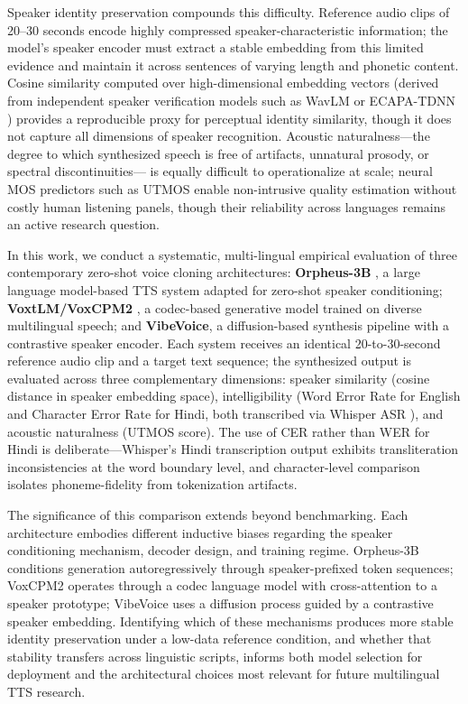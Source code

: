 Speaker identity preservation compounds this difficulty. Reference audio clips of 20--30 seconds encode highly compressed
speaker-characteristic information; the model's speaker encoder must extract a stable embedding from this limited evidence and
maintain it across sentences of varying length and phonetic content. Cosine similarity computed over high-dimensional embedding
vectors (derived from independent speaker verification models such as WavLM or ECAPA-TDNN \cite{chen2022wavlm, desplanques2020ecapa})
provides a reproducible proxy for perceptual identity similarity, though it does not capture all dimensions of speaker recognition.
Acoustic naturalness---the degree to which synthesized speech is free of artifacts, unnatural prosody, or spectral discontinuities---
is equally difficult to operationalize at scale; neural MOS predictors such as UTMOS \cite{saeki2022utmos} enable non-intrusive
quality estimation without costly human listening panels, though their reliability across languages remains an active research question.

In this work, we conduct a systematic, multi-lingual empirical evaluation of three contemporary zero-shot voice cloning
architectures: \textbf{Orpheus-3B} \cite{orpheus2024}, a large language model-based TTS system adapted for zero-shot speaker
conditioning; \textbf{VoxtLM/VoxCPM2} \cite{voxcpm2024}, a codec-based generative model trained on diverse multilingual speech; and
\textbf{VibeVoice}, a diffusion-based synthesis pipeline with a contrastive speaker encoder. Each system receives an identical
20-to-30-second reference audio clip and a target text sequence; the synthesized output is evaluated across three complementary
dimensions: speaker similarity (cosine distance in speaker embedding space), intelligibility (Word Error Rate for English and
Character Error Rate for Hindi, both transcribed via Whisper ASR \cite{radford2023whisper}), and acoustic naturalness (UTMOS score).
The use of CER rather than WER for Hindi is deliberate---Whisper's Hindi transcription output exhibits transliteration
inconsistencies at the word boundary level, and character-level comparison isolates phoneme-fidelity from tokenization artifacts.

The significance of this comparison extends beyond benchmarking. Each architecture embodies different inductive biases regarding the
speaker conditioning mechanism, decoder design, and training regime. Orpheus-3B conditions generation autoregressively through
speaker-prefixed token sequences; VoxCPM2 operates through a codec language model with cross-attention to a speaker prototype;
VibeVoice uses a diffusion process guided by a contrastive speaker embedding. Identifying which of these mechanisms produces more
stable identity preservation under a low-data reference condition, and whether that stability transfers across linguistic
scripts, informs both model selection for deployment and the architectural choices most relevant for future multilingual TTS research.


